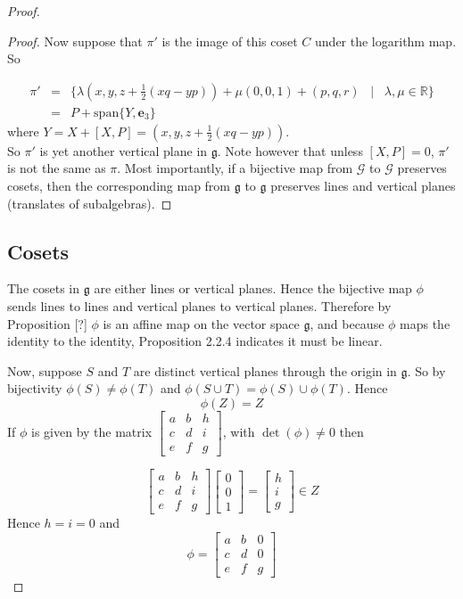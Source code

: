\documentclass[honours]{UNSWthesis}
\newcommand{\R}{\mathbb{R}}
\newcommand{\G}{\mathcal{G}}
\newcommand{\g}{\mathfrak{g}}
\newcommand{\1}{\mathbf{e}_{1}}
\newcommand{\2}{\mathbf{e}_{3}}
\newcommand{\3}{\mathbf{e}_{3}}
\begin{document}
\begin{proof}
\begin{proof}
Now suppose that $\pi'$ is the image of this coset $C$ under the logarithm map. So 

\begin{eqnarray*}
\pi' &=& \{ \lambda( x, y, z+\frac{1}{2}(xq-yp))+\mu(0,0,1)+(p,q,r) \;\;\;|\;\;\; \lambda,\mu \in \R \} \\
&=& P+\text{span}\{Y,\3 \}
\end{eqnarray*}
where $Y=X+[X,P]=( x, y, z+\frac{1}{2}(xq-yp))$. \\
So $\pi'$ is yet another vertical plane in $\g$. Note however that unless $[X,P]=0$, $\pi'$ is not the same as $\pi$. Most importantly, if a bijective map from $\G$ to $\G$ preserves cosets, then the corresponding map from $\g$ to $\g$ preserves lines and vertical planes (translates of subalgebras).
\end{proof}

\subsection{Cosets}
The cosets in $\g$ are either lines or vertical planes. Hence the bijective map $\phi$ sends lines to lines and vertical planes to vertical planes. Therefore by Proposition [?] $\phi$ is an affine map on the vector space $\g$, and because $\phi$ maps the identity to the identity, Proposition 2.2.4 indicates it must be linear.


Now, suppose $S$ and $T$ are distinct vertical planes through the origin in $\g$. So by bijectivity $\phi(S) \neq \phi(T)$ and $\phi(S \cup T)=\phi(S) \cup \phi(T)$. Hence 
\[
\phi(Z)=Z
\]
If $\phi$ is given by the matrix 
$\begin{bmatrix}
a & b & h \\
c & d & i \\
e & f & g
\end{bmatrix}
$, with $\det(\phi) \neq 0$ then 

\[
\begin{bmatrix}
a & b & h \\
c & d & i \\
e & f & g
\end{bmatrix} 
\begin{bmatrix}
0 \\ 0 \\ 1
\end{bmatrix} =
\begin{bmatrix}
h \\ i \\ g
\end{bmatrix} 
\in Z
\]
Hence $h=i=0$ and 
\[
\phi=
\begin{bmatrix}
a & b & 0 \\
c & d & 0 \\
e & f & g
\end{bmatrix}
\]

\end{proof}
\end{document}
